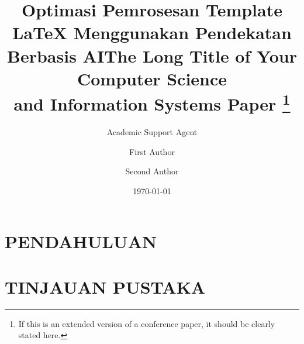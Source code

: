 \documentclass{comsis2}
\title{Optimasi Pemrosesan Template LaTeX Menggunakan Pendekatan Berbasis AI}
\author{Academic Support Agent}
\date{\today}
\begin{document}
\maketitle

\begin{abstract}

\end{abstract}

\chapter{PENDAHULUAN}


\chapter{TINJAUAN PUSTAKA}



\def\journalissue{Computer Science and Information Systems 00(0):0000--0000}
\def\paperidnum{https://doi.org/10.2298/CSIS123456789X}
\setcounter{page}{1}

\usepackage[pagewise]{lineno}
\linenumbers

\title{The Long Title of Your Computer Science\\and Information Systems Paper%
\footnote{If this is an extended version of a conference paper, it should be clearly stated here.}}


\author{First Author \and Second Author}


\end{document}
